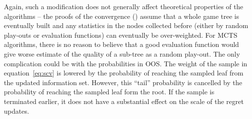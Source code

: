 Again, such a modification does not generally affect theoretical properties of the algorithms -- the proofs of the convergence (\eg \cite{lisy2013-nips}) assume that a whole game tree is eventually built and any statistics in the nodes collected before (either by random play-outs or evaluation functions) can eventually be over-weighted. For MCTS algorithms, there is no reason to believe that a good evaluation function would give worse estimate of the quality of a sub-tree as a random play-out. The only complication could be with the probabilities in OOS. The weight of the sample in equation~\ref{eq:scv} is lowered by the probability of reaching the sampled leaf from the updated information set. However, this ``tail'' probability is cancelled by the probability of reaching the sampled leaf form the root. 
If the sample is terminated earlier, it does not have a substantial effect on the scale of the regret updates.



